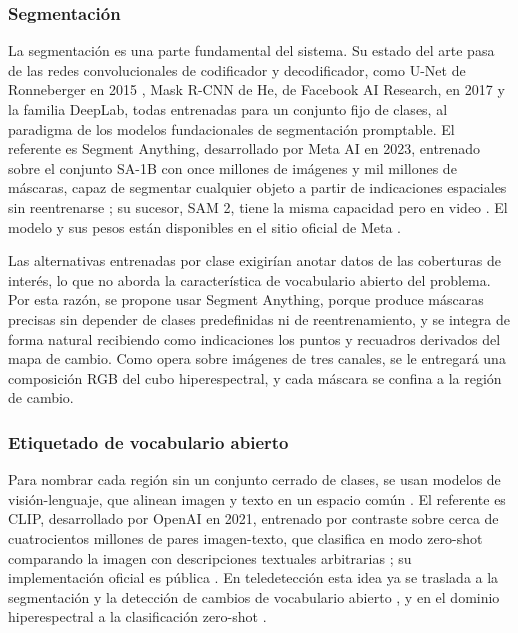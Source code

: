 \documentclass[12pt,onecolumn]{IEEEtran}
\begin{document}
\subsubsection{Segmentación}
La segmentación es una parte fundamental del sistema. Su estado del arte pasa de las redes convolucionales de codificador y decodificador, como U-Net de Ronneberger en 2015 \cite{ronneberger2015unet}, Mask R-CNN de He, de Facebook AI Research, en 2017 \cite{he2017maskrcnn} y la familia DeepLab, todas entrenadas para un conjunto fijo de clases, al paradigma de los modelos fundacionales de segmentación promptable. El referente es Segment Anything, desarrollado por Meta AI en 2023, entrenado sobre el conjunto SA-1B con once millones de imágenes y mil millones de máscaras, capaz de segmentar cualquier objeto a partir de indicaciones espaciales sin reentrenarse \cite{kirillov2023sam}; su sucesor, SAM 2, tiene la misma capacidad pero en video \cite{ravi2024sam2}. El modelo y sus pesos están disponibles en el sitio oficial de Meta \cite{meta2023sam_repo}.

Las alternativas entrenadas por clase exigirían anotar datos de las coberturas de interés, lo que no aborda la característica de vocabulario abierto del problema. Por esta razón, se propone usar Segment Anything, porque produce máscaras precisas sin depender de clases predefinidas ni de reentrenamiento, y se integra de forma natural recibiendo como indicaciones los puntos y recuadros derivados del mapa de cambio. Como opera sobre imágenes de tres canales, se le entregará una composición RGB del cubo hiperespectral, y cada máscara se confina a la región de cambio.

\subsubsection{Etiquetado de vocabulario abierto}
Para nombrar cada región sin un conjunto cerrado de clases, se usan modelos de visión-lenguaje, que alinean imagen y texto en un espacio común \cite{zhang2024vlm}. El referente es CLIP, desarrollado por OpenAI en 2021, entrenado por contraste sobre cerca de cuatrocientos millones de pares imagen-texto, que clasifica en modo zero-shot comparando la imagen con descripciones textuales arbitrarias \cite{radford2021clip}; su implementación oficial es pública \cite{openai2021clip_repo}. En teledetección esta idea ya se traslada a la segmentación y la detección de cambios de vocabulario abierto \cite{kombol2025trainingfree,zhu2025semanticcd}, y en el dominio hiperespectral a la clasificación zero-shot \cite{pang2025special}.
\end{document}
